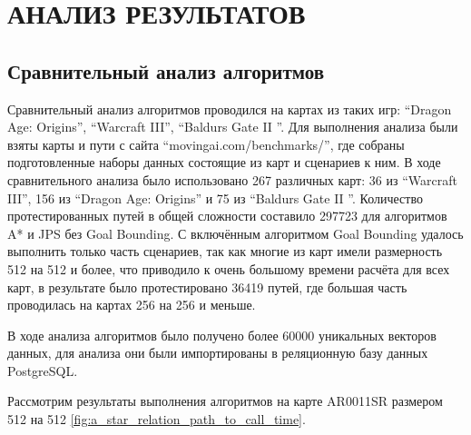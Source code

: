 \section[Анализ результатов]{\MakeTextUppercase{АНАЛИЗ РЕЗУЛЬТАТОВ}}

\subsection{Сравнительный анализ алгоритмов}

Сравнительный анализ алгоритмов проводился на картах из таких игр: ``Dragon Age: Origins'', ``Warcraft III'', ``Baldurs Gate II ''. Для выполнения анализа были взяты карты и пути с сайта ``movingai.com/benchmarks/'', где собраны подготовленные наборы данных состоящие из карт и сценариев к ним. В ходе сравнительного анализа было использовано 267 различных карт: 36 из ``Warcraft III'', 156 из ``Dragon Age: Origins'' и 75 из ``Baldurs Gate II ''. Количество протестированных путей в общей сложности составило 297723 для алгоритмов A* и JPS без Goal Bounding. С включённым алгоритмом Goal Bounding удалось выполнить только часть сценариев, так как многие из карт имели размерность 512 на 512 и более, что приводило к очень большому времени расчёта для всех карт, в результате было протестировано 36419 путей, где большая часть проводилась на картах 256 на 256 и меньше.

В ходе анализа алгоритмов было получено более 60000 уникальных векторов данных, для анализа они были импортированы в реляционную базу данных PostgreSQL.

Рассмотрим результаты выполнения алгоритмов на карте AR0011SR размером 512 на 512 \cref{fig:a_star_relation_path_to_call_time}. 

